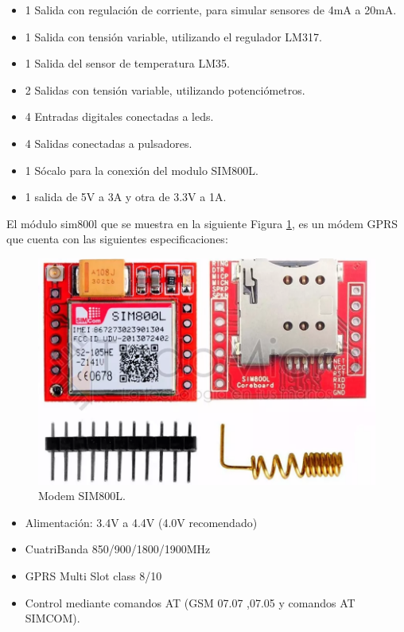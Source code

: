 \begin{itemize}
  \item 1 Salida con regulación de corriente, para simular sensores de 4mA a 20mA.
  \item 1 Salida con tensión variable, utilizando el regulador LM317.
  \item 1 Salida del sensor de temperatura LM35.
  \item 2 Salidas con tensión variable, utilizando potenciómetros. 
  \item 4 Entradas digitales conectadas a leds.
  \item 4 Salidas conectadas a pulsadores. 
  \item 1 Sócalo para la conexión del modulo SIM800L. 
  \item 1 salida de 5V a 3A y otra de 3.3V a 1A. 
\end{itemize}

El módulo sim800l que se muestra en la siguiente Figura \ref{fig:sim800l}, es un módem GPRS que cuenta con las siguientes especificaciones:

\begin{figure}[htb]
  \centering
  \includegraphics[scale=0.2]{./Figures/sim800.png}
  \caption{Modem SIM800L.}
  \label{fig:sim800l}
\end{figure}

\begin{itemize}
  \item Alimentación: 3.4V a 4.4V (4.0V recomendado)
  \item  CuatriBanda 850/900/1800/1900MHz
  \item  GPRS Multi Slot class 8/10
  \item  Control mediante comandos AT (GSM 07.07 ,07.05 y comandos AT SIMCOM).
\end{itemize}


